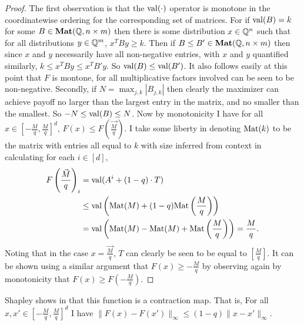 \begin{proof}
  The first observation is that the $\mathrm{val}(\cdot)$ operator is monotone in the coordinatewise ordering
  for the corresponding set of matrices. For
  if $\mathrm{val}(B) = k$ for some $B \in \mathbf{Mat}(\mathbb{Q}, n \times m)$ then there is some
  distribution $x \in \mathbb{Q}^n$ such that for all distributions $y \in \mathbb{Q}^m$, $x^T B y \geq k$.
  Then if $B \leq B' \in \mathbf{Mat}(\mathbb{Q}, n \times m)$ then since $x$ and $y$ necessarily have
  all non-negative entries, with $x$ and $y$ quantified similarly, $k \leq x^T B y \leq x^T B' y$. So $\mathrm{val}(B) \leq \mathrm{val}(B')$.
  It also follows easily at this point that $F$ is montone, for all multiplicative factors involved can be seen to be
  non-negative.
  Secondly, if $N = \max_{j, k} |B_{j, k}|$ then clearly the maximizer can achieve payoff
  no larger than the largest entry in the matrix, and no smaller than the smallest. So $-N \leq \mathrm{val}(B) \leq N$.
  Now by monotonicity I have for all $x \in [-\frac{M}{q}, \frac{M}{q}]^d$, $F(x) \leq F\left(\vec{\frac{M}{q}}\right)$.
  I take some liberty in denoting $\mathrm{Mat}(k)$ to be the matrix
  with entries all equal to $k$ with size inferred from context in calculating for each $i \in [d]$,
  \begin{align*}
    F\left(\vec{\frac{M}{q}}\right)_i &= \mathrm{val}(A^i + (1 - q) \cdot T) \\
                               &\leq \mathrm{val}\left(\mathrm{Mat}(M) + (1 - q) \mathrm{Mat}\left(\frac{M}{q}\right)\right) \\
                               &= \mathrm{val}\left(\mathrm{Mat}(M) - \mathrm{Mat}(M) + \mathrm{Mat}\left(\frac{M}{q}\right)\right) = \frac{M}{q}.
  \end{align*}
  Noting that in the case $x = \vec{\frac{M}{q}}$, $T$ can clearly be seen to be equal to $[\frac{M}{q}]$.
  It can be shown using a similar argument that $F(x) \geq -\frac{M}{q}$ by observing again by monotonicity
  that $F(x) \geq F\left(-\frac{M}{q}\right)$.
\end{proof}
Shapley shows in \citep{shapley} that this function is a contraction map. That is,
For all $x, x' \in [-\frac{M}{q}, \frac{M}{q}]^d$ I have $\|F(x) - F(x')\|_\infty \leq (1 - q) \|x - x'\|_\infty$.
